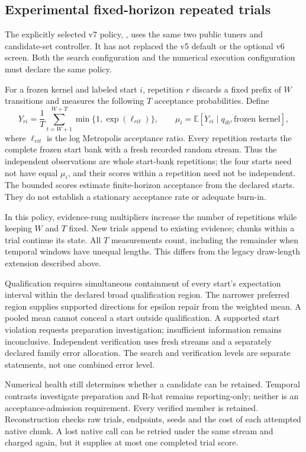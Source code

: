 \subsection{Experimental fixed-horizon repeated trials}

The explicitly selected v7 policy, , uses
the same two public tuners and candidate-set controller. It has not replaced
the v5 default or the optional v6 screen. Both the search configuration and
the numerical execution configuration must declare the same policy.

For a frozen kernel and labeled start $i$, repetition $r$ discards a fixed
prefix of $W$ transitions and measures the following $T$ acceptance
probabilities. Define
\[
 Y_{ri}=\frac{1}{T}\sum_{t=W+1}^{W+T}\min\{1,\exp(\ell_{rit})\},
 \qquad \mu_i=\mathbb{E}[Y_{ri}\mid q_{i0},\text{frozen kernel}],
\]
where $\ell_{rit}$ is the log Metropolis acceptance ratio. Every repetition
restarts the complete frozen start bank with a fresh recorded random stream.
Thus the independent observations are whole start-bank repetitions; the four
starts need not have equal $\mu_i$, and their scores within a repetition need
not be independent. The bounded scores estimate finite-horizon acceptance
from the declared starts. They do not establish a stationary acceptance rate
or adequate burn-in.

In this policy, evidence-rung multipliers increase the number of repetitions
while keeping $W$ and $T$ fixed. New trials append to existing evidence;
chunks within a trial continue its state. All $T$ measurements count, including
the remainder when temporal windows have unequal lengths. This differs from
the legacy draw-length extension described above.

Qualification requires simultaneous containment of every start's expectation
interval within the declared broad qualification region. The narrower
preferred region supplies supported directions for epsilon repair from the
weighted mean. A pooled mean cannot conceal a start outside qualification.
A supported start violation requests preparation investigation; insufficient
information remains inconclusive. Independent verification uses fresh streams
and a separately declared family error allocation. The search and verification
levels are separate statements, not one combined error level.

Numerical health still determines whether a candidate can be retained.
Temporal contrasts investigate preparation and R-hat remains reporting-only;
neither is an acceptance-admission requirement. Every verified member is
retained. Reconstruction checks raw trials, endpoints, seeds and the cost of
each attempted native chunk. A lost native call can be retried under the same
stream and charged again, but it supplies at most one completed trial score.

